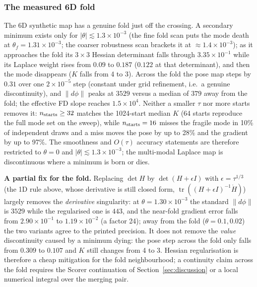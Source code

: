 \subsubsection{The measured 6D fold}\label{sec:fold6d}

The 6D synthetic map has a genuine fold just off the crossing. A secondary minimum exists only for $|\theta|\lesssim1.3\times10^{-3}$ (the fine fold scan puts the mode death at $\theta_f=1.31\times10^{-3}$; the coarser robustness scan brackets it at $\approx1.4\times10^{-3}$); as it approaches the fold its $3\times3$ Hessian determinant falls through $3.35\times10^{-1}$ while its Laplace weight rises from $0.09$ to $0.187$ ($0.122$ at that determinant), and then the mode disappears ($K$ falls from 4 to 3). Across the fold the pose map steps by $0.31$ over one $2\times10^{-5}$ step (constant under grid refinement, i.e.\ a genuine discontinuity), and $\|d\phi\|$ peaks at $3529$ versus a median of $379$ away from the fold; the effective FD slope reaches $1.5\times10^4$. Neither a smaller $\tau$ nor more starts removes it: $n_{\rm starts}\ge32$ matches the 1024-start median $K$ (64 starts reproduce the full mode set on the sweep), while $n_{\rm starts}=16$ misses the fragile mode in 10\% of independent draws and a miss moves the pose by up to 28\% and the gradient by up to 97\%. The smoothness and $O(\tau)$ accuracy statements are therefore restricted to $\theta=0$ and $|\theta|\lesssim1.3\times10^{-3}$; the multi-modal Laplace map is discontinuous where a minimum is born or dies.

\textbf{A partial fix for the fold.} Replacing $\det H$ by $\det(H+\epsilon I)$ with $\epsilon=\tau^{1/3}$ (the 1D rule above, whose derivative is still closed form, $\operatorname{tr}((H+\epsilon I)^{-1}\dot H)$) largely removes the \emph{derivative} singularity: at $\theta=1.30\times10^{-3}$ the standard $\|d\phi\|$ is $3529$ while the regularised one is $443$, and the near-fold gradient error falls from $2.90\times10^{-1}$ to $1.19\times10^{-2}$ (a factor 24); away from the fold ($\theta=0.1,0.02$) the two variants agree to the printed precision. It does not remove the \emph{value} discontinuity caused by a minimum dying: the pose step across the fold only falls from $0.309$ to $0.107$ and $K$ still changes from 4 to 3. Hessian regularisation is therefore a cheap mitigation for the fold neighbourhood; a continuity claim across the fold requires the Scorer continuation of Section~\ref{sec:discussion} or a local numerical integral over the merging pair.

